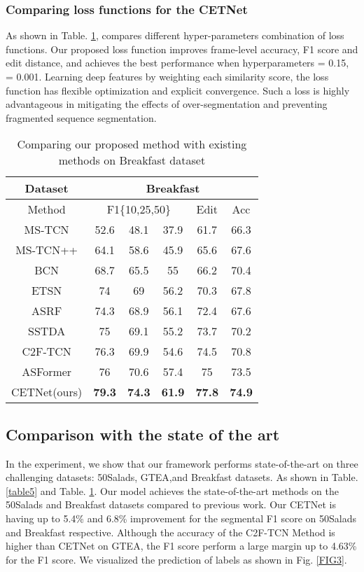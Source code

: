 \documentclass[runningheads]{llncs}
\begin{document}
\subsubsection{Comparing loss functions for the CETNet}
\par{
	As shown in Table. \ref{table4}, compares different hyper-parameters combination of loss functions. Our proposed loss function improves frame-level accuracy, F1 score and edit distance, and achieves the best performance when hyperparameters  = 0.15,  = 0.001. Learning deep features by weighting each similarity score, the loss function has flexible optimization and explicit convergence. Such a loss is highly advantageous in mitigating the effects of over-segmentation and preventing fragmented sequence segmentation.
}
\begin{table}[ht]
	\centering
	\caption{Comparing our proposed method with existing methods on Breakfast dataset}
	\setlength{\tabcolsep}{2.5mm}
	\begin{tabular}{cccccc}
		\toprule
		Dataset & \multicolumn{5}{c}{Breakfast} \\
		\midrule
		Method & \multicolumn{3}{c}{F1\{10,25,50\}} & Edit  & Acc \\
		\midrule
		MS-TCN\cite{farha2019ms} & 52.6  & 48.1  & 37.9  & 61.7  & 66.3 \\
		MS-TCN++\cite{li2020ms} & 64.1  & 58.6  & 45.9  & 65.6  & 67.6 \\
		BCN\cite{wang2020boundary}   & 68.7  & 65.5  & 55    & 66.2  & 70.4 \\
		ETSN\cite{li2021efficient}  & 74    & 69    & 56.2  & 70.3  & 67.8 \\
		ASRF\cite{ishikawa2021alleviating}  & 74.3  & 68.9  & 56.1  & 72.4  & 67.6 \\
		SSTDA\cite{chen2020action} & 75    & 69.1  & 55.2  & 73.7  & 70.2 \\
		C2F-TCN\cite{singhania2021coarse} & 76.3  & 69.9  & 54.6  & 74.5  & 70.8 \\
		ASFormer\cite{yi2021asformer} & 76    & 70.6  & 57.4  & 75    & 73.5 \\
		CETNet(ours) & \textbf{79.3} & \textbf{74.3} & \textbf{61.9} & \textbf{77.8} & \textbf{74.9} \\
		\bottomrule
	\end{tabular}\label{table4}\end{table}

\subsection{Comparison with the state of the art}
\par{
	In the experiment, we show that our framework performs state-of-the-art on three challenging datasets: 50Salads, GTEA,and Breakfast datasets. As shown in Table. \ref{table5} and Table. \ref{table4}. Our model achieves the state-of-the-art methods on the 50Salads and Breakfast datasets compared to previous work. Our CETNet is having up to 5.4\% and 6.8\% improvement for the segmental F1 score on 50Salads and Breakfast respective. Although the accuracy of the C2F-TCN Method is higher than CETNet on GTEA, the F1 score perform a large margin up to 4.63\% for the F1 score. We visualized the prediction of labels as shown in Fig. \ref{FIG3}.
}
\end{document}
